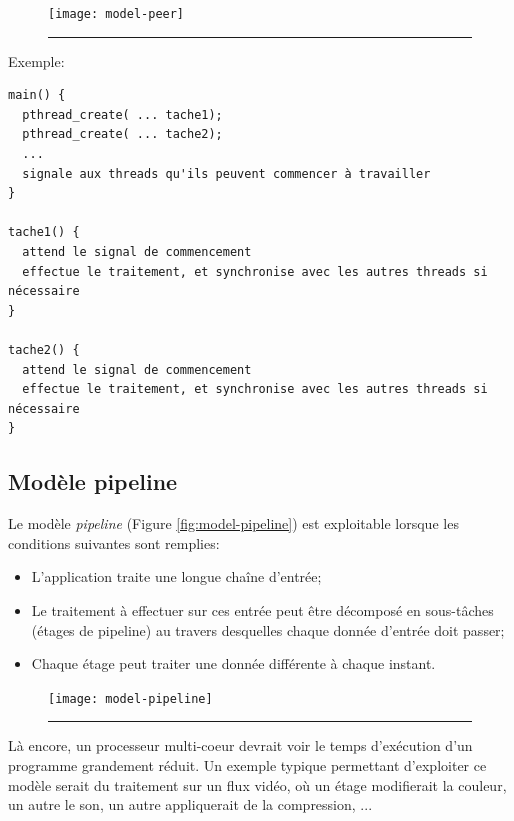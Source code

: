 \begin{figure}[ht]
\begin{center}
\texttt{[image: model-peer]}
\end{center}
\vspace{-.3cm}
\rule{\textwidth}{0.01in}
\end{figure}


Exemple:

\begin{lstlisting}[frame=trBL]
main() {
  pthread_create( ... tache1);
  pthread_create( ... tache2);
  ...
  signale aux threads qu'ils peuvent commencer à travailler
}

tache1() {
  attend le signal de commencement
  effectue le traitement, et synchronise avec les autres threads si nécessaire
}

tache2() {
  attend le signal de commencement
  effectue le traitement, et synchronise avec les autres threads si nécessaire
}
\end{lstlisting}

\subsection{Modèle pipeline}

Le modèle \emph{pipeline} (Figure \ref{fig:model-pipeline}) est exploitable lorsque les conditions suivantes sont remplies:

\begin{itemize}
\item L'application traite une longue chaîne d'entrée;
\item Le traitement à effectuer sur ces entrée peut être décomposé en sous-tâches (étages de pipeline) au travers desquelles chaque donnée d'entrée doit passer;
\item Chaque étage peut traiter une donnée différente à chaque instant.
\end{itemize}


\begin{figure}[ht]
\begin{center}
\texttt{[image: model-pipeline]}
\end{center}
\vspace{-.3cm}
\rule{\textwidth}{0.01in}
\end{figure}


Là encore, un processeur multi-coeur devrait voir le temps d'exécution d'un programme grandement réduit. Un exemple typique permettant d'exploiter ce modèle serait du traitement sur un flux vidéo, où un étage modifierait la couleur, un autre le son, un autre appliquerait de la compression, ...

